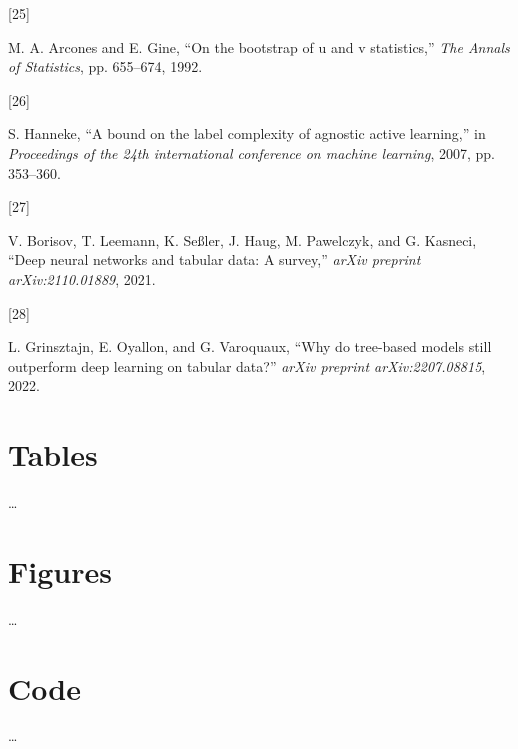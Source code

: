 \documentclass[
  conference]{IEEEtran}
\newlength{\cslhangindent}
\newlength{\csllabelwidth}
\newlength{\cslentryspacingunit} %
\newenvironment{CSLReferences}[2] %
 {%
  \setlength{\parindent}{0pt}
  \ifodd #1
  \let\oldpar\par
  \def\par{\hangindent=\cslhangindent\oldpar}
  \fi
  \setlength{\parskip}{#2\cslentryspacingunit}
 }%
 {}
\newcommand{\CSLLeftMargin}[1]{\parbox[t]{\csllabelwidth}{#1}}
\newcommand{\CSLRightInline}[1]{\parbox[t]{\linewidth - \csllabelwidth}{#1}\break}
\begin{document}
\begin{CSLReferences}{0}{0}
\leavevmode{}%
\CSLLeftMargin{{[}25{]} }%
\CSLRightInline{M. A. Arcones and E. Gine, {``On the bootstrap of u and
v statistics,''} \emph{The Annals of Statistics}, pp. 655--674, 1992.}

\leavevmode{}%
\CSLLeftMargin{{[}26{]} }%
\CSLRightInline{S. Hanneke, {``A bound on the label complexity of
agnostic active learning,''} in \emph{Proceedings of the 24th
international conference on machine learning}, 2007, pp. 353--360.}

\leavevmode{}%
\CSLLeftMargin{{[}27{]} }%
\CSLRightInline{V. Borisov, T. Leemann, K. Seßler, J. Haug, M.
Pawelczyk, and G. Kasneci, {``Deep neural networks and tabular data: A
survey,''} \emph{arXiv preprint arXiv:2110.01889}, 2021.}

\leavevmode{}%
\CSLLeftMargin{{[}28{]} }%
\CSLRightInline{L. Grinsztajn, E. Oyallon, and G. Varoquaux, {``Why do
tree-based models still outperform deep learning on tabular data?''}
\emph{arXiv preprint arXiv:2207.08815}, 2022.}

\end{CSLReferences}

\pagebreak

\hypertarget{tables}{%
\section{Tables}\label{tables}}

\ldots{}

\pagebreak

\hypertarget{figures}{%
\section{Figures}\label{figures}}

\ldots{}

\pagebreak

\hypertarget{code}{%
\section{Code}\label{code}}

\ldots{}
\end{document}
